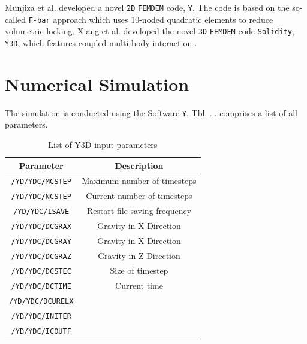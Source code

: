 \documentclass[format=acmtog, 12pt, screen=true, review=false]{acmart}
\begin{document}
\bigbreak
Munjiza et al. \cite{Mun13} developed a novel \texttt{2D} \texttt{FEMDEM} code, \texttt{Y}. The code is based on the so-called \texttt{F-bar} approach which uses 10-noded quadratic elements to reduce volumetric locking. Xiang et al. \cite{Xia09} developed the novel \texttt{3D} \texttt{FEMDEM} code \texttt{Solidity}, \texttt{Y3D}, which features coupled multi-body interaction \cite{Lat15}.

\section{Numerical Simulation}

The simulation is conducted using the Software \texttt{Y}. Tbl. ... comprises a list of all parameters.

\begin{table}
  \caption{List of Y3D input parameters}
  \label{tab:inpar}
  \begin{tabular}{cc}
    \toprule
    Parameter               & Description                   \\
    \midrule
    \texttt{/YD/YDC/MCSTEP} & Maximum number of timesteps   \\
    \texttt{/YD/YDC/NCSTEP} & Current number of timesteps   \\
    \texttt{/YD/YDC/ISAVE}  & Restart file saving frequency \\
    \texttt{/YD/YDC/DCGRAX} & Gravity in X Direction        \\
    \texttt{/YD/YDC/DCGRAY} & Gravity in X Direction        \\
    \texttt{/YD/YDC/DCGRAZ} & Gravity in Z Direction        \\
    \texttt{/YD/YDC/DCSTEC} & Size of timestep              \\
    \texttt{/YD/YDC/DCTIME} & Current time                  \\
    \texttt{/YD/YDC/DCURELX}&                               \\
    \texttt{/YD/YDC/INITER} &                               \\
    \texttt{/YD/YDC/ICOUTF} &                               \\
    
    
  \bottomrule
  \end{tabular}
\end{table}
  
\end{document}
